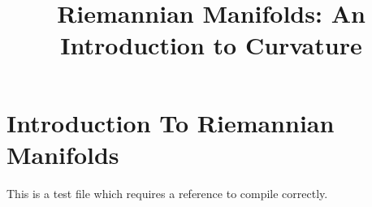 


%


\title{Riemannian Manifolds: An Introduction to Curvature}


\maketitle

\label{section-phantom}

\tableofcontents

\section{Introduction To Riemannian Manifolds}
\label{section-introduction}

This is a test file which requires a reference to compile correctly. \cite{Maclane}







